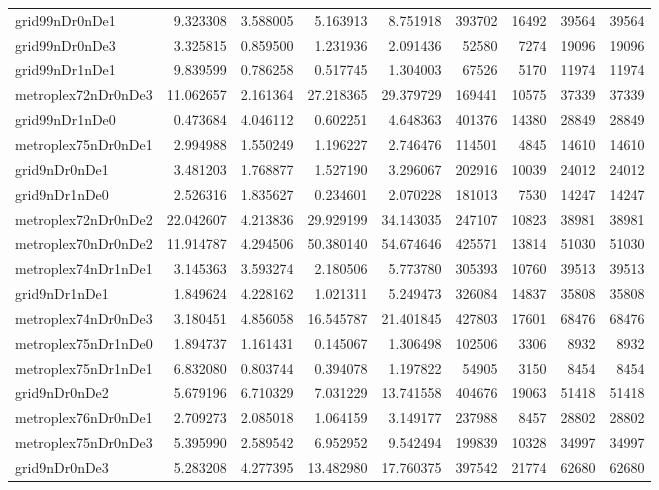 \begin{longtable}{|l|r|r|r|r|r|r|r|r|}
grid99nDr0nDe1 & 9.323308 & 3.588005 & 5.163913 & 8.751918 & 393702 & 16492 & 39564 & 39564 \\
grid99nDr0nDe3 & 3.325815 & 0.859500 & 1.231936 & 2.091436 & 52580 & 7274 & 19096 & 19096 \\
grid99nDr1nDe1 & 9.839599 & 0.786258 & 0.517745 & 1.304003 & 67526 & 5170 & 11974 & 11974 \\
metroplex72nDr0nDe3 & 11.062657 & 2.161364 & 27.218365 & 29.379729 & 169441 & 10575 & 37339 & 37339 \\
grid99nDr1nDe0 & 0.473684 & 4.046112 & 0.602251 & 4.648363 & 401376 & 14380 & 28849 & 28849 \\
metroplex75nDr0nDe1 & 2.994988 & 1.550249 & 1.196227 & 2.746476 & 114501 & 4845 & 14610 & 14610 \\
grid9nDr0nDe1 & 3.481203 & 1.768877 & 1.527190 & 3.296067 & 202916 & 10039 & 24012 & 24012 \\
grid9nDr1nDe0 & 2.526316 & 1.835627 & 0.234601 & 2.070228 & 181013 & 7530 & 14247 & 14247 \\
metroplex72nDr0nDe2 & 22.042607 & 4.213836 & 29.929199 & 34.143035 & 247107 & 10823 & 38981 & 38981 \\
metroplex70nDr0nDe2 & 11.914787 & 4.294506 & 50.380140 & 54.674646 & 425571 & 13814 & 51030 & 51030 \\
metroplex74nDr1nDe1 & 3.145363 & 3.593274 & 2.180506 & 5.773780 & 305393 & 10760 & 39513 & 39513 \\
grid9nDr1nDe1 & 1.849624 & 4.228162 & 1.021311 & 5.249473 & 326084 & 14837 & 35808 & 35808 \\
metroplex74nDr0nDe3 & 3.180451 & 4.856058 & 16.545787 & 21.401845 & 427803 & 17601 & 68476 & 68476 \\
metroplex75nDr1nDe0 & 1.894737 & 1.161431 & 0.145067 & 1.306498 & 102506 & 3306 & 8932 & 8932 \\
metroplex75nDr1nDe1 & 6.832080 & 0.803744 & 0.394078 & 1.197822 & 54905 & 3150 & 8454 & 8454 \\
grid9nDr0nDe2 & 5.679196 & 6.710329 & 7.031229 & 13.741558 & 404676 & 19063 & 51418 & 51418 \\
metroplex76nDr0nDe1 & 2.709273 & 2.085018 & 1.064159 & 3.149177 & 237988 & 8457 & 28802 & 28802 \\
metroplex75nDr0nDe3 & 5.395990 & 2.589542 & 6.952952 & 9.542494 & 199839 & 10328 & 34997 & 34997 \\
grid9nDr0nDe3 & 5.283208 & 4.277395 & 13.482980 & 17.760375 & 397542 & 21774 & 62680 & 62680 \\

\end{longtable}
